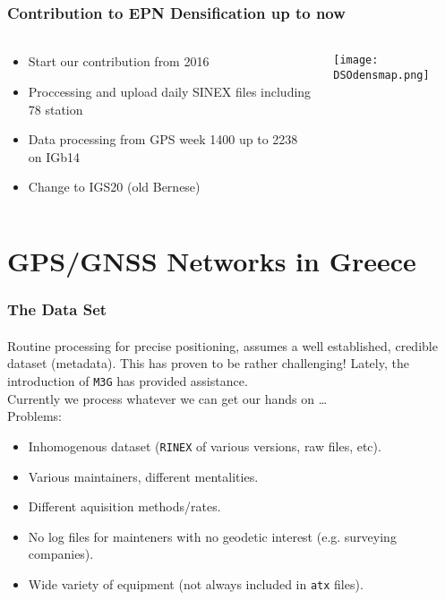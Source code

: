 \begin{frame}
  \frametitle{Contribution to EPN Densification up to now}
  \framesubtitle{}
  \label{}
  \begin{columns}[T]
    \begin{column}{.5\textwidth}
      \begin{itemize}\setlength\itemsep{.5em}
        \item Start our contribution from 2016
        \item Proccessing and upload daily SINEX files including 78 station
        \item Data processing from GPS week 1400 up to 2238 on IGb14 
        \item Change to IGS20 (old Bernese)
      \end{itemize}  
    \end{column}
    \begin{column}{.5\textwidth}
      \begin{center}
        \texttt{[image: DSOdensmap.png]}
      \end{center}     
    \end{column}
  \end{columns}
\end{frame}
\note{}

\section{GPS/GNSS Networks in Greece}

\begin{frame}\frametitle{The Data Set}\framesubtitle{}
\vskip-1.5cm
  Routine processing for precise positioning, assumes a well established, 
  credible dataset (metadata). This has proven to be rather challenging! Lately, 
  the introduction of \texttt{M3G} has provided assistance.\\
  \bigskip
  Currently we process whatever we can get our hands on \ldots\\
  Problems:
  \begin{itemize}
    \item Inhomogenous dataset (\texttt{RINEX} of various versions, raw files, etc).
    \item Various maintainers, different mentalities.
    \item Different aquisition methods/rates.
    \item No log files for mainteners with no geodetic interest (e.g. surveying companies).
    \item Wide variety of equipment (not always included in \texttt{atx} files).
  \end{itemize}
\end{frame}
\note


